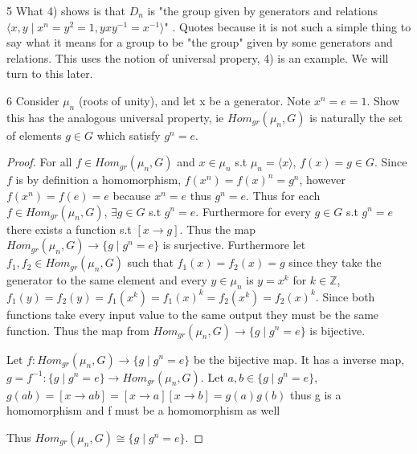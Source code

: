 \documentclass{article}
\newcommand{\Z}{\mathbb{Z}}
\newcommand{\angles}[1]{\langle{#1}\rangle}
\begin{document}
\bigskip

\begin{PROB}{5}\label{Problem 5.}
    What 4) shows is that $D_n$ is "the group given by generators and relations $\angles{x, y \mid x^n = y^2 = 1, yxy^{-1} = x^{-1}}$" . Quotes because it is not such a simple thing to say what it means for a group to be "the group" given by some generators and relations.  This uses the notion of universal propery, 4) is an example. We will turn to this later.
\end{PROB}

\bigskip

\begin{PROB}{6}\label{Problem 6.}
    Consider $\mu_n$ (roots of unity), and let x be a generator. Note $x^n = e = 1$. Show this has the analogous universal property, ie $Hom_{gr}(\mu_n,G)$ is naturally the set of elements $g \in G$ which satisfy $g^n = e$. 
\end{PROB}
\begin{proof}
    For all $f \in Hom_{gr}(\mu_n,G)$ and $x \in \mu_n$ s.t $\mu_n = \angles{x}$, $f(x) = g \in G$. Since $f$ is by definition a homomorphism, $f(x^n) = f(x)^n = g^n$, however $f(x^n) = f(e) =e$ because $x^n = e$ thus $g^n = e$. Thus for each $f \in Hom_{gr}(\mu_n,G)$, $\exists g \in G$ s.t $g^n = e$. Furthermore for every $g \in G$ s.t $g^n  = e$ there exists a function s.t $[x \to g]$. Thus the map $Hom_{gr}(\mu_n,G) \to \{g \mid g^n = e\}$ is surjective. Furthermore let $f_1, f_2 \in Hom_{gr}(\mu_n,G)$ such that $f_1(x) = f_2(x) = g$ since they take the generator to the same element and every $y \in \mu_n$ is $y = x^k$ for $k \in \Z$, $f_1(y) = f_2(y) = f_1(x^k) = f_1(x)^k = f_2(x^k) = f_2(x)^k$. Since both functions take every input value to the same output they must be the same function. Thus the map from $Hom_{gr}(\mu_n,G) \to \{g \mid g^n = e\}$ is bijective.
    
    Let $f: Hom_{gr}(\mu_n,G) \to \{g \mid g^n = e\}$ be the bijective map. It has a inverse map, $g = f^{-1} : \{g \mid g^n = e\} \to Hom_{gr}(\mu_n,G)$. Let $a, b \in \{g \mid g^n = e\}$, $g(ab) = [x \to ab] = [x \to a][x \to b] = g(a)g(b)$ thus g is a homomorphism and f must be a homomorphism as well
    
    Thus $Hom_{gr}(\mu_n,G) \cong \{g \mid g^n = e\}$.
\end{proof}
\end{document}
